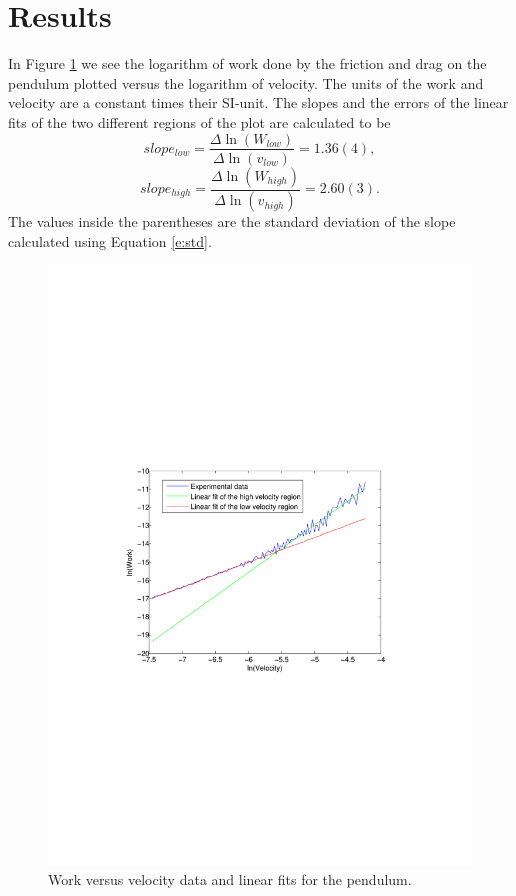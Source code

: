 \documentclass[11pt, a4paper]{article}
\begin{document}
\section{Results}
In Figure \ref{f:nopaper} we see the logarithm of work done by the friction and 
drag on the pendulum plotted versus the logarithm of velocity. 
The units of the work and velocity are a constant times their SI-unit. 
The slopes and the errors of the linear fits of the two different regions of the plot are calculated to be
\[
	slope_{low}=\frac{\Delta\ln(W_{low})}{\Delta\ln(v_{low})} = 1.36(4),
\]\[
	slope_{high}=\frac{\Delta\ln(W_{high})}{\Delta\ln(v_{high})} = 2.60(3).
\]
The values inside the parentheses are the standard deviation of the slope calculated using Equation \ref{e:std}.

\begin{figure}[h]
	\centering
	\includegraphics[trim=10.0cm 10.0cm 10.0cm 10.0cm, scale=0.7]{no_paper}
	\caption{Work versus velocity data and  linear fits for the pendulum.}
	\label{f:nopaper}
\end{figure}
\end{document}

